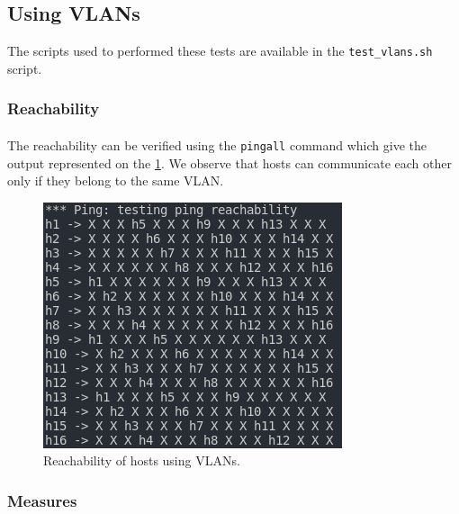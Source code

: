 \documentclass[a4paper, 11pt, oneside]{article}
\begin{document}
\subsection{Using VLANs}
The scripts used to performed these tests are available in the \texttt{test\_vlans.sh} script.
\subsubsection{Reachability}

\paragraph{}The reachability can be verified using the \texttt{pingall} command which give the output represented on the \ref{VLANs_reach}. We observe that hosts can communicate each other only if they belong to the same VLAN.

\begin{figure}[H]
\center
\includegraphics[scale = 2]{VLANs/VLANs_reach.png}
\caption{Reachability of hosts using VLANs.}
\label{VLANs_reach}
\end{figure}

\subsubsection{Measures}
\end{document}
